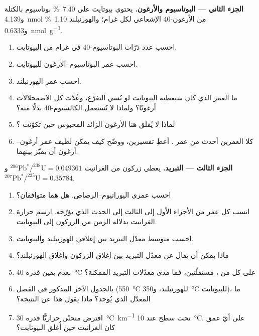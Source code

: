 \begin{problem}
\noindent\textbf{الجزء الثاني --- البوتاسيوم والأرغون.} يحتوي بيوتايت على \qty{7.40}{\percent} بوتاسيوم بالكتلة و\qty{4.139}{nmol} من الأرغون-40 الإشعاعي لكل غرام؛ والهورنبلند \qty{1.10}{\percent} و\qty{0.6333}{nmol.g^{-1}}.
\begin{enumerate}[resume]
  \item احسب عدد ذرّات البوتاسيوم-40 في غرام من البيوتايت.
  \item احسب عمر البوتاسيوم–الأرغون للبيوتايت.
  \item احسب عمر الهورنبلند.
  \item ما العمر الذي كان سيعطيه البيوتايت لو نُسي التفرّع، وعُدّت كل الاضمحلالات أرغونًا؟ ولماذا لا يُستعمل الكالسيوم-40 بدلًا منه؟
  \item لماذا لا يُقلق هنا الأرغون الزائد المحبوس حين تكوّنت ؟
  \item كلا العمرين أحدث من عمر . أعطِ تفسيرين، ووضّح كيف يمكن لطيف عمر أرغون–أرغون أن يميّز بينهما.
\end{enumerate}

\noindent\textbf{الجزء الثالث --- التبريد.} يعطي زركون من الغرانيت $^{206}\mathrm{Pb}^*/^{238}\mathrm{U} = 0.049361$ و$^{207}\mathrm{Pb}^*/^{235}\mathrm{U} = 0.35784$.
\begin{enumerate}[resume]
  \item احسب عمري اليورانيوم–الرصاص. هل هما متوافقان؟
  \item انسب كل عمر من الأجزاء الأول إلى الثالث إلى الحدث الذي يؤرّخه. ارسم حرارة الغرانيت بدلالة الزمن من الزركون إلى البيوتايت.
  \item احسب متوسط معدّل التبريد بين إغلاقي الهورنبلند والبيوتايت.
  \item ماذا يمكن أن يقال عن معدّل التبريد بين إغلاق الزركون وإغلاق الهورنبلند؟
  \item بعدم يقين قدره \qty{40}{\celsius} على كل من ، مستقلّتين، فما مدى معدّلات التبريد الممكنة؟
  \item بالجدول الآخر المذكور في الفصل (\qty{550}{\celsius} للهورنبلند، و\qty{350}{\celsius} للبيوتايت)، ما المعدّل الذي يُوجد؟ ماذا يقول هذا عن النتيجة؟
  \item افترض منحنًى حراريًّا قدره \qty{30}{\celsius.km^{-1}} تحت سطح عند \qty{10}{\celsius}. على أيّ عمق كان الغرانيت حين أُغلق البيوتايت؟
\end{enumerate}


\end{problem}
